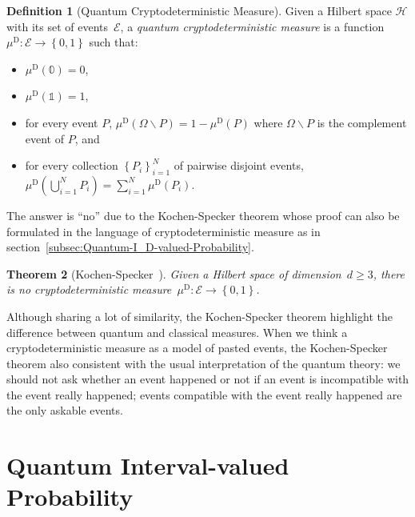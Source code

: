 \documentclass[12pt]{iopart}
\theoremstyle{plain}
\newtheorem{thm}{Theorem}
\theoremstyle{definition}
\newtheorem{definition}[thm]{Definition}
\theoremstyle{remark}
\newcommand{\Hilb}{\mathcal{H}}
\newcommand{\events}{\ensuremath{\mathcal{E}}}
\begin{document}
\begin{definition}[Quantum Cryptodeterministic Measure]\label{def:QuantumCryptodeterministicMeasures}Given
a Hilbert space $\Hilb$ with its set of events~$\events$, a \emph{quantum
cryptodeterministic measure} is a function~$\mu^{\mathrm{D}}:\events\rightarrow\left\{ 0,1\right\} $
such that: 
\begin{itemize}
\item $\mu^{\mathrm{D}}(\mathbb{0})=0$, 
\item $\mu^{\mathrm{D}}(\mathbb{1})=1$, 
\item for every event $P$, $\mu^{\mathrm{D}}\left(\Omega\backslash P\right)=1-\mu^{\mathrm{D}}\left(P\right)$
where $\Omega\backslash P$ is the complement event of $P$, and 
\item for every collection $\left\{ P_{i}\right\} _{i=1}^{N}$ of pairwise
disjoint events, $\mu^{\mathrm{D}}\left(\bigcup_{i=1}^{N}P_{i}\right)=\sum_{i=1}^{N}\mu^{\mathrm{D}}(P_{i})$. 
\end{itemize}
\end{definition}

The answer is ``no'' due to the Kochen-Specker theorem whose proof
can also be formulated in the language of cryptodeterministic measure
as in section~\ref{subsec:Quantum-I_D-valued-Probability}.

\begin{thm}[Kochen-Specker~\cite{kochenspecker1967,peres1995quantum,Redhead1987-REDINA}]\label{thm:Kochen-Specker}Given
a Hilbert space of dimension~$d\ge3$, there is no cryptodeterministic
measure~$\mu^{\mathrm{D}}:\events\rightarrow\left\{ 0,1\right\} $.\end{thm}

Although sharing a lot of similarity, the Kochen-Specker theorem highlight
the difference between quantum and classical measures. When we think
a cryptodeterministic measure as a model of pasted events, the Kochen-Specker
theorem also consistent with the usual interpretation of the quantum
theory: we should not ask whether an event happened or not if an event
is incompatible with the event really happened; events compatible
with the event really happened are the only askable events.



\section{Quantum Interval-valued Probability}
\end{document}
